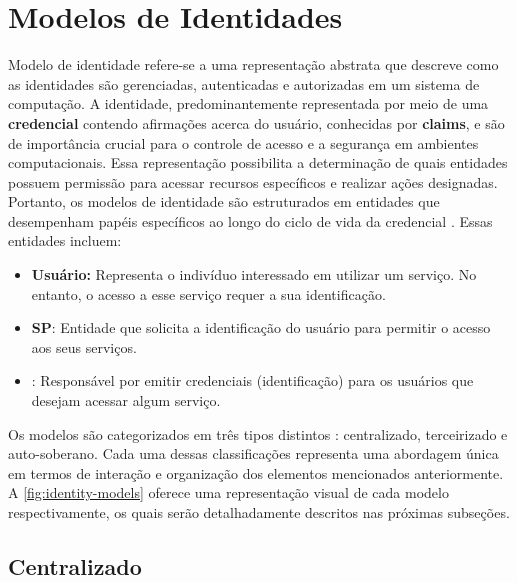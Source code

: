 \section{Modelos de Identidades}\label{section:modelos}

Modelo de identidade refere-se a uma representação abstrata que descreve como as identidades são gerenciadas, autenticadas e autorizadas em um sistema de computação. A identidade, predominantemente representada por meio de uma \textbf{credencial} contendo afirmações acerca do usuário, conhecidas por \textbf{claims}, e são de importância crucial para o controle de acesso e a segurança em ambientes computacionais. Essa representação possibilita a determinação de quais entidades possuem permissão para acessar recursos específicos e realizar ações designadas. Portanto, os modelos de identidade são estruturados em entidades que desempenham papéis específicos ao longo do ciclo de vida da credencial \cite{bertino2009identity}. Essas entidades incluem:

\begin{itemize}
    
    \item \textbf{Usuário:} Representa o indivíduo interessado em utilizar um serviço. No entanto, o acesso a esse serviço requer a sua identificação.
    
    \item \textbf{\acs{SP}}: Entidade que solicita a identificação do usuário para permitir o acesso aos seus serviços.
    
    \item \textbf{}: Responsável por emitir credenciais (identificação) para os usuários que desejam acessar algum serviço.
    
\end{itemize}

Os modelos são categorizados em três tipos distintos \cite{revisao-ssi-frederico}: centralizado, terceirizado e auto-soberano. Cada uma dessas classificações representa uma abordagem única em termos de interação e organização dos elementos mencionados anteriormente. A  \autoref{fig:identity-models} oferece uma representação visual de cada modelo respectivamente, os quais serão detalhadamente descritos nas próximas subseções.



\subsection{Centralizado}\label{subsection:centralizado}

